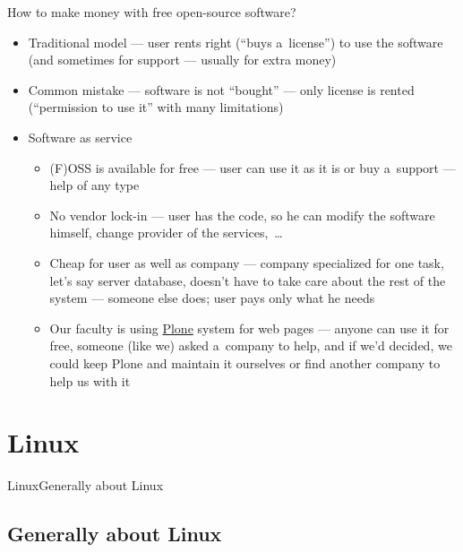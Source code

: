 \documentclass[compress, ucs, xelatex, 11pt, xcolor=svgnames, aspectratio=169,
	hyperref={
		bookmarks=true,
		unicode=true,
		colorlinks=true,
		pdftitle={Linux, command line and MetaCentrum},
		plainpages=false,
		pdfauthor={Vojtech Zeisek},
		pdfsubject={Course about use of Linux command line, writing shell scripts and using MetaCentrum of CESNET},
		pdfcreator={XeLaTeX},
		pdfkeywords={Linux, GNU, BASH, shell, command line, MetaCentrum},
		linkcolor=DarkRed, %
		anchorcolor=DarkBlue, %
		citecolor=Indigo, %
		filecolor=NavyBlue, %
		menucolor=DarkMagenta, %
		urlcolor=DarkBlue, %
		pdftex},
	url={hyphens, lowtilde} %
	]{beamer}
\begin{document}
\begin{frame}{How to make money with free open-source software?}
	\begin{itemize}
		\item Traditional model --- user rents right (\enquote{buys a~license}) to use the software (and sometimes for support --- usually for extra money)
		\item Common mistake --- software is not \enquote{bought} --- only license is rented (\enquote{permission to use it} with many limitations)
		\item Software as service
		\begin{itemize}
			\item (F)OSS is available for free --- user can use it as it is or buy a~support --- help of any type
			\item No vendor lock-in --- user has the code, so he can modify the software himself, change provider of the services,~\ldots
			\item Cheap for user as well as company --- company specialized for one task, let's say server database, doesn't have to take care about the rest of the system --- someone else does; user pays only what he needs
			\item Our faculty is using \href{https://plone.org/}{Plone} system for web pages --- anyone can use it for free, someone (like we) asked a~company to help, and if we'd decided, we  could keep Plone and maintain it ourselves or find another company to help us with it
		\end{itemize}
	\end{itemize}
\end{frame}

\section{Linux}

\begin{frame}{Linux}{Generally about Linux}
	\tableofcontents[currentsection, sectionstyle=show/hide, hideothersubsections]
\end{frame}

\subsection{Generally about Linux}
\end{document}
